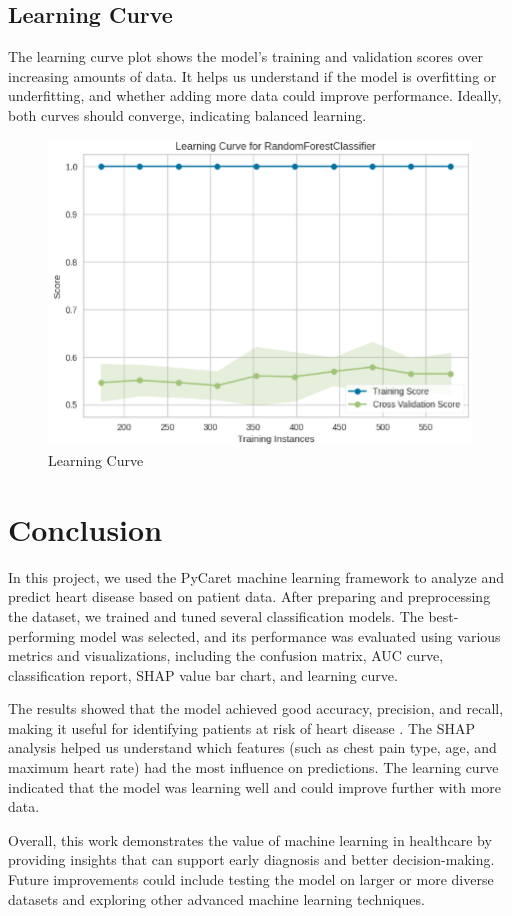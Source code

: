 \documentclass[journal]{IEEEtran}
\begin{document}
\subsection{Learning Curve}
The learning curve plot shows the model’s training and validation scores over increasing amounts of data. It helps us understand if the model is overfitting or underfitting, and whether adding more data could improve performance. Ideally, both curves should converge, indicating balanced learning.
\begin{figure}[h]
    \centering
    \includegraphics[width=1\linewidth]{images/Learning Curve.png}
    \caption{Learning Curve}
    \label{fig:learning-curve}
\end{figure}


\section{Conclusion}
In this project, we used the PyCaret machine learning framework to analyze and predict heart disease based on patient data. After preparing and preprocessing the dataset, we trained and tuned several classification models. The best-performing model was selected, and its performance was evaluated using various metrics and visualizations, including the confusion matrix, AUC curve, classification report, SHAP value bar chart, and learning curve.

The results showed that the model achieved good accuracy, precision, and recall, making it useful for identifying patients at risk of heart disease \cite{chen2011hdps}. The SHAP analysis helped us understand which features (such as chest pain type, age, and maximum heart rate) had the most influence on predictions. The learning curve indicated that the model was learning well and could improve further with more data.

Overall, this work demonstrates the value of machine learning in healthcare by providing insights that can support early diagnosis and better decision-making. Future improvements could include testing the model on larger or more diverse datasets and exploring other advanced machine learning techniques.



\printbibliography 
\end{document}
